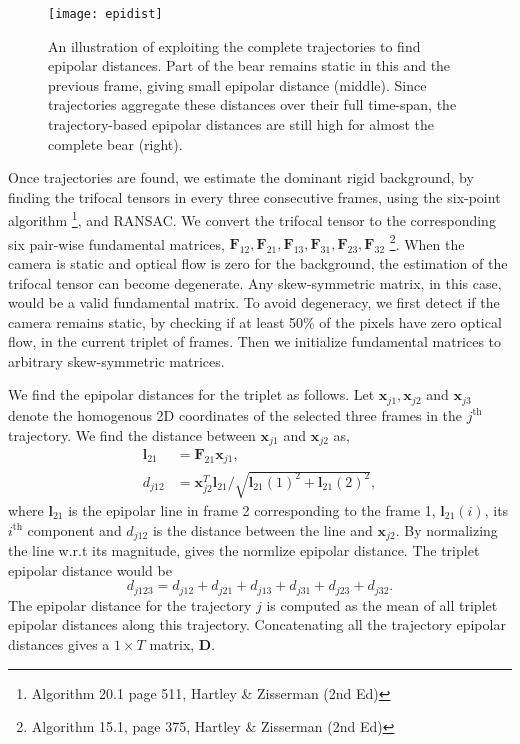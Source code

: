\documentclass[10pt,twocolumn,letterpaper]{article}
\begin{document}
\begin{figure}[t]
\centering
\texttt{[image: epidist]}
\caption{An illustration of exploiting the complete trajectories to find epipolar distances. Part of the bear remains static in this and the previous frame, giving small epipolar distance (middle). Since trajectories aggregate these distances over their full time-span, the trajectory-based epipolar distances are still high for almost the complete bear (right).}
\vspace{-0.5cm}
\label{fig:epipolarDistance}
\end{figure}

Once trajectories are found, we estimate the dominant rigid background, by finding the trifocal tensors in every three consecutive frames, using the six-point algorithm \cite{hartley2003multiple}\footnote{Algorithm 20.1 page 511, Hartley \& Zisserman (2nd Ed)}, and RANSAC. We convert the trifocal tensor to the corresponding six pair-wise fundamental matrices, $\mathbf{F}_{12}, \mathbf{F}_{21}, \mathbf{F}_{13}, \mathbf{F}_{31}, \mathbf{F}_{23}, \mathbf{F}_{32}$ \cite{hartley2003multiple}\footnote{Algorithm 15.1, page 375, Hartley \& Zisserman (2nd Ed)}. When the camera is static and optical flow is zero for the background, the estimation of the trifocal tensor can become degenerate. Any skew-symmetric matrix, in this case, would be a valid fundamental matrix. To avoid degeneracy, we first detect if the camera remains static, by checking if at least 50\% of the pixels have zero optical flow, in the current triplet of frames. Then we initialize fundamental matrices to arbitrary skew-symmetric matrices. 

We find the epipolar distances for the triplet as follows. Let $\mathbf{x}_{j1}, \mathbf{x}_{j2}$ and $\mathbf{x}_{j3}$ denote the homogenous 2D coordinates of the selected three frames in the $j^\mathrm{th}$ trajectory. We find the distance between $\mathbf{x}_{j1}$ and $\mathbf{x}_{j2}$ as,
\vspace{-0.1cm}
\begin{align}
    \mathbf{l}_{21}  & =  \mathbf{F}_{21} \mathbf{x}_{j1},\\
      d_{j12}& = \mathbf{x}_{j2}^T  \mathbf{l}_{21}/ \sqrt{\mathbf{l}_{21}(1)^2 + \mathbf{l}_{21}(2)^2},
\end{align}
where $\mathbf{l}_{21}$ is the epipolar line in frame 2 corresponding to the frame 1, $\mathbf{l}_{21}(i)$, its $i^\mathrm{th}$ component and $d_{j12}$ is the distance between the line and $\mathbf{x}_{j2}$. By normalizing the line w.r.t its magnitude, gives the normlize epipolar distance. The triplet epipolar distance would be
\vspace{-0.1cm}
\begin{equation}
d_{j123} = d_{j12}+d_{j21}+d_{j13}+d_{j31}+d_{j23}+d_{j32}.
\end{equation}
The epipolar distance for the trajectory $j$ is computed as the mean of all triplet epipolar distances along this trajectory. Concatenating all the trajectory epipolar distances gives a $1\times T$ matrix, $\mathbf{D}$.
\end{document}
